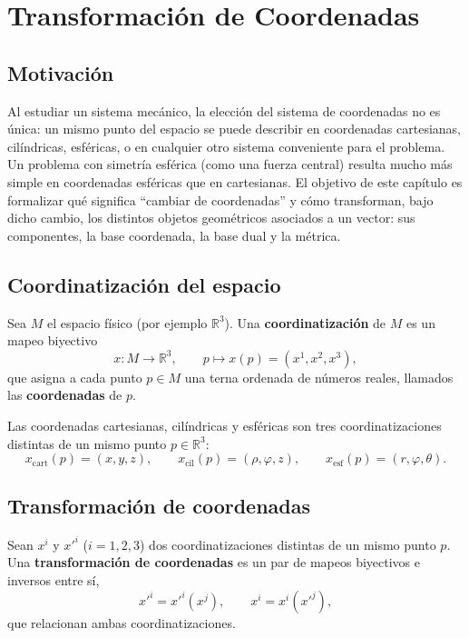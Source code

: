 \chapter{Transformación de Coordenadas}

\section{Motivación}

Al estudiar un sistema mecánico, la elección del sistema de coordenadas no
es única: un mismo punto del espacio se puede describir en coordenadas
cartesianas, cilíndricas, esféricas, o en cualquier otro sistema
conveniente para el problema. Un problema con simetría esférica (como una
fuerza central) resulta mucho más simple en coordenadas esféricas que en
cartesianas. El objetivo de este capítulo es formalizar qué significa
``cambiar de coordenadas'' y cómo transforman, bajo dicho cambio, los
distintos objetos geométricos asociados a un vector: sus componentes, la
base coordenada, la base dual y la métrica.

\section{Coordinatización del espacio}

\begin{definicion}[Coordinatización]
Sea $M$ el espacio físico (por ejemplo $\mathbb{R}^3$). Una
\textbf{coordinatización} de $M$ es un mapeo biyectivo
\[
x : M \longrightarrow \mathbb{R}^3, \qquad p \longmapsto x(p) =
(x^1,x^2,x^3),
\]
que asigna a cada punto $p \in M$ una terna ordenada de números reales,
llamados las \textbf{coordenadas} de $p$.
\end{definicion}

\begin{ejemplo}
Las coordenadas cartesianas, cilíndricas y esféricas son tres
coordinatizaciones distintas de un mismo punto $p \in \mathbb{R}^3$:
\[
x_{\text{cart}}(p) = (x,y,z), \qquad
x_{\text{cil}}(p) = (\rho,\varphi,z), \qquad
x_{\text{esf}}(p) = (r,\varphi,\theta).
\]
\end{ejemplo}

\section{Transformación de coordenadas}

\begin{definicion}
Sean $x^i$ y $x'^i$ ($i=1,2,3$) dos coordinatizaciones distintas de un
mismo punto $p$. Una \textbf{transformación de coordenadas} es un par de
mapeos biyectivos e inversos entre sí,
\[
x'^i = x'^i(x^j), \qquad x^i = x^i(x'^j),
\]
que relacionan ambas coordinatizaciones.
\end{definicion}

